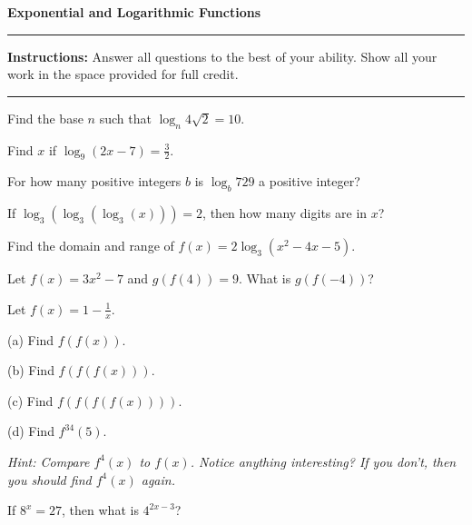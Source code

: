 \documentclass[12pt]{exam}
\newcommand{\examtitle}{Exponential and Logarithmic Functions}
\newcommand{\instructions}{
    \noindent\rule{\textwidth}{0.5pt}
    \begin{center}
    \textbf{Instructions:} Answer all questions to the best of your ability. Show all your work in the space provided for full credit.
    \end{center}
    \noindent\rule{\textwidth}{0.5pt}
}
\begin{document}
\begin{center}
\textbf{\Large \examtitle} \\
\vspace{0.5cm}
\hspace{0.1\textwidth}
\end{center}

\instructions
\vspace{0.5cm}

\begin{questions}

\pointsinrightmargin

\question[8]
Find the base $n$ such that $\log_n 4\sqrt{2} = 10$.
\vspace*{4cm}

\question[10]
Find $x$ if $\log_9(2x - 7) = \frac{3}{2}$.
\vspace*{4cm}

\question[8]
For how many positive integers $b$ is $\log_b 729$ a positive integer?
\vspace*{4cm}

\newpage

\question[10]
If $\log_3(\log_3(\log_3(x))) = 2$, then how many digits are in $x$?
\vspace*{4cm}

\question[12]
Find the domain and range of $f(x) = 2\log_3(x^2 - 4x - 5)$.
\vspace*{5cm}

\newpage

\question[10]
Let $f(x) = 3x^2 - 7$ and $g(f(4)) = 9$. What is $g(f(-4))$?
\vspace*{4cm}

\question[12]
Let $f(x) = 1 - \frac{1}{x}$.

(a) Find $f(f(x))$.
\vspace*{3cm}

(b) Find $f(f(f(x)))$.
\vspace*{3cm}

(c) Find $f(f(f(f(x))))$.
\vspace*{3cm}

(d) Find $f^{34}(5)$.

\textit{Hint: Compare $f^4(x)$ to $f(x)$. Notice anything interesting? If you don't, then you should find $f^4(x)$ again.}
\vspace*{3cm}

\newpage

\question[10]
If $8^x = 27$, then what is $4^{2x - 3}$?


\end{questions}
\end{document}
